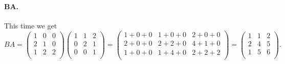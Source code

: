 \paragraph{BA.} This time we get
\[ 
BA = \begin{pmatrix}
1 & 0 & 0\\
2 & 1 & 0\\
1 & 2 & 2\\
\end{pmatrix} \begin{pmatrix}
1 & 1 & 2\\
0 & 2 & 1\\
0 & 0 & 1\\
\end{pmatrix} = \begin{pmatrix}
1 + 0 + 0 & 1 + 0 + 0 & 2 + 0 + 0 \\
2 + 0 + 0 & 2 + 2 + 0 & 4 + 1 + 0\\
1 + 0 + 0 & 1 + 4 + 0 & 2 + 2 + 2\\
\end{pmatrix} = \begin{pmatrix}
1 & 1 & 2\\
2 & 4 & 5\\
1 & 5 & 6\\
\end{pmatrix}
.\]

